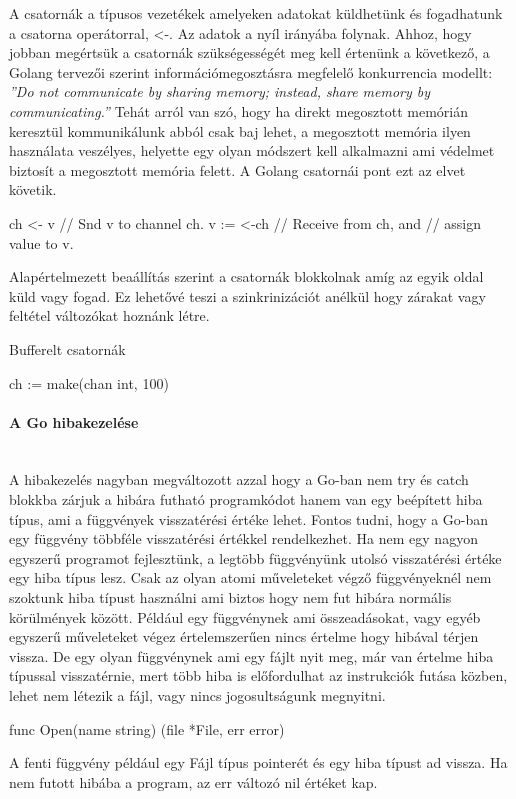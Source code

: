 A csatornák a típusos vezetékek amelyeken adatokat küldhetünk és fogadhatunk a csatorna operátorral, <-.
Az adatok a nyíl irányába folynak. Ahhoz, hogy jobban megértsük a csatornák szükségességét meg kell értenünk a következő, a Golang tervezői szerint információmegosztásra megfelelő konkurrencia modellt:
\emph{''Do not communicate by sharing memory; instead, share memory by communicating.''}
Tehát arról van szó, hogy ha direkt megosztott memórián keresztül kommunikálunk abból csak baj lehet, a megosztott memória ilyen használata veszélyes, helyette egy olyan módszert
kell alkalmazni ami védelmet biztosít a megosztott memória felett. A Golang csatornái pont ezt az elvet követik.
\begin{python}
    ch <- v    // Snd v to channel ch.
    v := <-ch  // Receive from ch, and
    // assign value to v.
\end{python}
Alapértelmezett beaállítás szerint a csatornák blokkolnak amíg az egyik oldal küld vagy fogad.
Ez lehetővé teszi a szinkrinizációt anélkül hogy zárakat vagy feltétel változókat hoznánk létre.

Bufferelt csatornák
\begin{python}
    ch := make(chan int, 100)
\end{python}


\paragraph{A Go hibakezelése} \mbox{} \\
A hibakezelés nagyban megváltozott azzal hogy a Go-ban nem try és catch blokkba zárjuk a hibára futható programkódot
hanem van egy beépített hiba típus, ami a függvények visszatérési értéke lehet. Fontos tudni, hogy a Go-ban egy függvény többféle
visszatérési értékkel rendelkezhet. Ha nem egy nagyon egyszerű programot fejlesztünk, a legtöbb függvényünk utolsó visszatérési értéke egy hiba típus lesz.
Csak az olyan atomi műveleteket végző függvényeknél nem szoktunk hiba típust használni ami biztos hogy nem fut hibára normális körülmények között.
Például egy függvénynek ami összeadásokat, vagy egyéb egyszerű műveleteket végez értelemszerűen nincs értelme hogy hibával térjen vissza.
De egy olyan függvénynek ami egy fájlt nyit meg, már van értelme hiba típussal visszatérnie, mert több hiba is előfordulhat az instrukciók futása közben, lehet nem létezik a fájl, vagy nincs jogosultságunk megnyitni.
\begin{python}
    func Open(name string) (file *File, err error)
\end{python}
A fenti függvény például egy Fájl típus pointerét és egy hiba típust ad vissza. Ha nem futott hibába a program, az err változó nil értéket kap.

